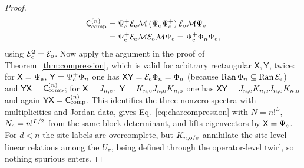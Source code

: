 \documentclass[aps,prx,reprint,superscriptaddress,nobibnotes,longbibliography]{revtex4-2}
\theoremstyle{remark}
\newcommand{\Ran}{\operatorname{Ran}}
\newcommand{\Ccomp}{\mathsf C_{\rm comp}}
\begin{document}
\begin{proof}
\begin{align*}
 \Ccomp^{(n)}&=\Psi_{\rm e}^+\mathcal E_{\rm e}\mathcal M\,(\Psi_{\rm o}\Psi_{\rm o}^+)\,\mathcal E_{\rm o}\mathcal M\Psi_{\rm e}\\
 &=\Psi_{\rm e}^+\mathcal E_{\rm e}\mathcal M\mathcal E_{\rm o}\mathcal M\Psi_{\rm e}=\Psi_{\rm e}^+\Phi_n\Psi_{\rm e},
\end{align*}
using $\mathcal E_{\rm o}^2=\mathcal E_{\rm o}$.  Now apply the argument in the proof of Theorem~\ref{thm:compression}, which is valid for arbitrary rectangular $\mathsf X,\mathsf Y$, twice: for $\mathsf X=\Psi_{\rm e}$, $\mathsf Y=\Psi_{\rm e}^+\Phi_n$ one has $\mathsf X\mathsf Y=\mathcal E_{\rm e}\Phi_n=\Phi_n$ (because $\Ran\Phi_n\subseteq\Ran\mathcal E_{\rm e}$) and $\mathsf Y\mathsf X=\Ccomp^{(n)}$; for $\mathsf X=J_{n,{\rm e}}$, $\mathsf Y=K_{n,{\rm e}}J_{n,{\rm o}}K_{n,{\rm o}}$ one has $\mathsf X\mathsf Y=J_{n,{\rm e}}K_{n,{\rm e}}J_{n,{\rm o}}K_{n,{\rm o}}$ and again $\mathsf Y\mathsf X=\Ccomp^{(n)}$.  This identifies the three nonzero spectra with multiplicities and Jordan data, gives Eq.~\eqref{eq:charcompression} with $N=n!^L$, $N_{\rm c}=n!^{L/2}$ from the same block determinant, and lifts eigenvectors by $\mathsf X=\Psi_{\rm e}$.  For $d<n$ the site labels are overcomplete, but $K_{n,{\rm o/e}}$ annihilate the site-level linear relations among the $U_\pi$, being defined through the operator-level twirl, so nothing spurious enters.

\end{proof}
\end{document}
